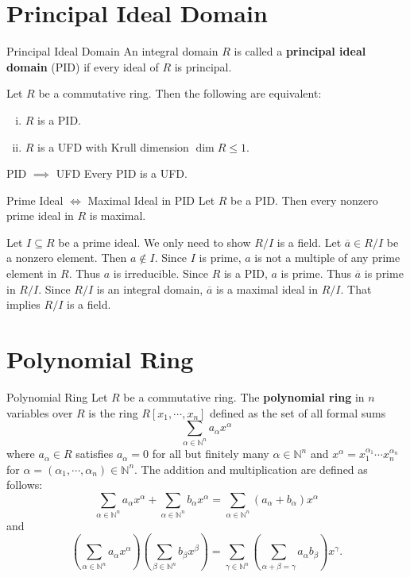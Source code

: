 \section{Principal Ideal Domain}
\begin{definition}{Principal Ideal Domain}{}
    An integral domain $R$ is called a \textbf{principal ideal domain} (PID) if every ideal of $R$ is principal.
\end{definition}

\begin{proposition}{}{}
    Let $R$ be a commutative ring. Then the following are equivalent:
    \begin{enumerate}[(i)]
        \item $R$ is a PID.
        \item $R$ is a UFD with Krull dimension $\dim R \le 1$.
    \end{enumerate}
\end{proposition}
\begin{corollary}{PID $\implies$ UFD}{}
    Every PID is a UFD.
\end{corollary}


\begin{proposition}{Prime Ideal $\iff$ Maximal Ideal in PID}{}
    Let $R$ be a PID. Then every nonzero prime ideal in $R$ is maximal.
\end{proposition}

\begin{prf}
    Let $I\subseteq R$ be a prime ideal. We only need to show $R/I$ is a field. Let $\overline{a}\in R/I$ be a nonzero element. Then $a\notin I$. Since $I$ is prime, $a$ is not a multiple of any prime element in $R$. Thus $a$ is irreducible. Since $R$ is a PID, $a$ is prime. Thus $\overline{a}$ is prime in $R/I$. Since $R/I$ is an integral domain, $\overline{a}$ is a maximal ideal in $R/I$. That implies $R/I$ is a field.
\end{prf}







\section{Polynomial Ring}
\begin{definition}{Polynomial Ring}{}
    Let $R$ be a commutative ring. The \textbf{polynomial ring} in $n$ variables over $R$ is the ring $R[x_1,\cdots,x_n]$ defined as the set of all formal sums $$\sum_{\alpha\in\mathbb{N}^n}a_\alpha x^\alpha$$ where $a_\alpha\in R$ satisfies $a_\alpha=0$ for all but finitely many $\alpha\in\mathbb{N}^n$ and $x^\alpha=x_1^{\alpha_1}\cdots x_n^{\alpha_n}$ for $\alpha=(\alpha_1,\cdots,\alpha_n)\in\mathbb{N}^n$. The addition and multiplication are defined as follows: $$\sum_{\alpha\in\mathbb{N}^n}a_\alpha x^\alpha+\sum_{\alpha\in\mathbb{N}^n}b_\alpha x^\alpha=\sum_{\alpha\in\mathbb{N}^n}(a_\alpha+b_\alpha)x^\alpha$$ and $$\left(\sum_{\alpha\in\mathbb{N}^n}a_\alpha x^\alpha\right)\left(\sum_{\beta\in\mathbb{N}^n}b_\beta x^\beta\right)=\sum_{\gamma\in\mathbb{N}^n}\left(\sum_{\alpha+\beta=\gamma}a_\alpha b_\beta\right)x^\gamma.$$
\end{definition}


